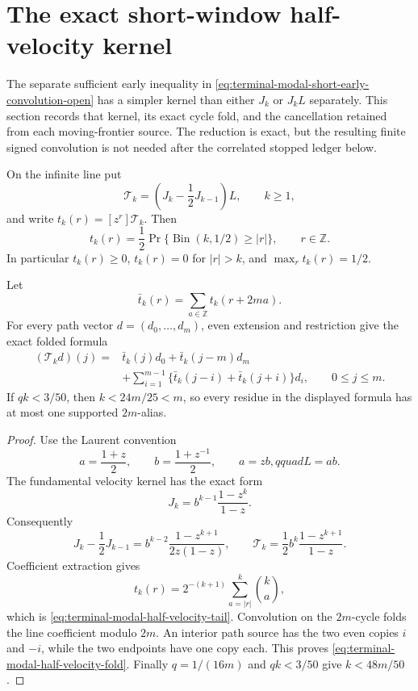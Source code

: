 \section{The exact short-window half-velocity kernel}
\label{sec:terminal-modal-early-kernel}

The separate sufficient early inequality in
\eqref{eq:terminal-modal-short-early-convolution-open} has a simpler kernel
than either $J_k$ or $J_kL$ separately.  This section records that kernel,
its exact cycle fold, and the cancellation retained from each moving-frontier
source.  The reduction is exact, but the resulting finite signed convolution
is not needed after the correlated stopped ledger below.

\begin{lemma}
\label{lem:terminal-modal-half-velocity-kernel}
On the infinite line put
\[
 \mathcal T_k=\left(J_k-\frac12J_{k-1}\right)L,
 \qquad k\ge1,
\]
and write $t_k(r)=[z^r]\mathcal T_k$.  Then
\begin{equation}
 t_k(r)=\frac12\Pr\{\operatorname{Bin}(k,1/2)\ge |r|\},
 \qquad r\in\mathbb Z.
 \label{eq:terminal-modal-half-velocity-tail}
\end{equation}
In particular $t_k(r)\ge0$, $t_k(r)=0$ for $|r|>k$, and
$\max_rt_k(r)=1/2$.

Let
\[
 \bar t_k(r)=\sum_{a\in\mathbb Z}t_k(r+2ma).
\]
For every path vector $d=(d_0,\ldots,d_m)$, even extension and restriction
give the exact folded formula
\begin{equation}
 \begin{split}
 (\mathcal T_kd)(j)={}&\bar t_k(j)d_0+\bar t_k(j-m)d_m\\
 &+\sum_{i=1}^{m-1}
 \{\bar t_k(j-i)+\bar t_k(j+i)\}d_i,
 \qquad0\le j\le m.
 \end{split}
 \label{eq:terminal-modal-half-velocity-fold}
\end{equation}
If $qk<3/50$, then $k<24m/25<m$, so every residue in the displayed
formula has at most one supported $2m$-alias.
\end{lemma}

\begin{proof}
Use the Laurent convention
\[
 a=\frac{1+z}{2},\qquad b=\frac{1+z^{-1}}2,
 \qquad a=zb,qquad L=ab.
\]
The fundamental velocity kernel has the exact form
\begin{equation}
 J_k=b^{k-1}\frac{1-z^k}{1-z}.
 \label{eq:terminal-modal-J-Laurent}
\end{equation}
Consequently
\begin{equation}
 J_k-\frac12J_{k-1}
 =b^{k-2}\frac{1-z^{k+1}}{2z(1-z)},
 \qquad
 \mathcal T_k=\frac12b^k\frac{1-z^{k+1}}{1-z}.
 \label{eq:terminal-modal-half-velocity-Laurent}
\end{equation}
Coefficient extraction gives
\[
 t_k(r)=2^{-(k+1)}\sum_{a=|r|}^k\binom ka,
\]
which is \eqref{eq:terminal-modal-half-velocity-tail}.  Convolution on the
$2m$-cycle folds the line coefficient modulo $2m$.  An interior path source
has the two even copies $i$ and $-i$, while the two endpoints have one copy
each.  This proves \eqref{eq:terminal-modal-half-velocity-fold}.  Finally
$q=1/(16m)$ and $qk<3/50$ give $k<48m/50$.
\end{proof}

